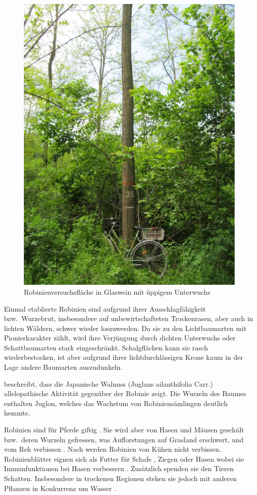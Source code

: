 \documentclass[twocolumn]{scrartcl}
\begin{document}
\begin{figure}[htbp]
  \centering
  \includegraphics[width=.9\linewidth]{./bild/GlasweinRobinie2023a}
  \caption{Robinienversuchsfläche in Glaswein mit üppigem Unterwuchs}
  \label{fig:glaswein}
\end{figure}

Einmal etablierte Robinien sind aufgrund ihrer Ausschlagfähigkeit
bzw.\ Wurzebrut, insbesondere auf unbewirtschafteten Trockenrasen, aber
auch in lichten Wäldern, schwer wieder loszuwerden. Da sie zu den
Lichtbaumarten mit Pionierkarakter zählt, wird ihre Verjüngung durch
dichten Unterwuchs oder Schattbaumarten stark
eingeschränkt. Schalgflächen kann sie rasch wiederbestocken, ist aber
aufgrund ihrer lichtdurchlässigen Krone kaum in der Lage andere
Baumarten auszudunkeln.

\cite{jung2010robinie} beschreibt, dass die Japanische Walnuss (Juglans
ailanthifolia Carr.) allelopathische Aktivität gegenüber der Robinie
zeigt. Die Wurzeln des Baumes enthalten Juglon, welches das Wachstum
von Robiniensämlingen deutlich hemmte.

Robinien sind für Pferde giftig \citep{grosche2008robiniePferd}. Sie
wird aber von Hasen und Mäusen geschält bzw.\ deren Wurzeln gefressen,
was Aufforstungen auf Grasland erschwert, und vom Reh verbissen
\citep{barta2023robinieReh}. Nach \cite{berner2018robinie} werden
Robinien von Kühen nicht verbissen. Robinienblätter eignen sich als
Futter für Schafe \citep{ganai2009robnieSchaf}, Ziegen
\citep{papachristou1999robinieZiege} oder Hasen
\citep{singh2010robnieHasennahrung} wobei sie Immunfunktionen bei
Hasen verbessern \citep{yang2017robinieHasen}.
Zusätzlich spenden sie den Tieren Schatten.
Insbesondere in trockenen Regionen stehen sie jedoch mit anderen Pflanzen in Konkurrenz um Wasser \citep{halasz2021robinieAlsTierutter}.
\end{document}
